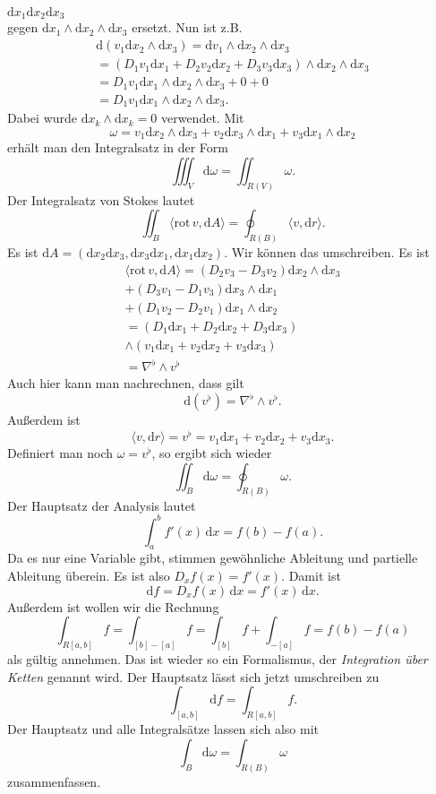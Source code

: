\documentclass[a4paper,10pt,fleqn,twocolumn,twoside]{article}
\begin{document}
$\mathrm dx_1\mathrm dx_2\mathrm dx_3$\\
gegen $\mathrm dx_1\wedge\mathrm dx_2\wedge\mathrm dx_3$
ersetzt. Nun ist z.B.
\begin{gather*}\mathrm d(v_1\mathrm dx_2\wedge\mathrm dx_3)
= \mathrm dv_1\wedge\mathrm dx_2\wedge\mathrm dx_3\\
= (D_1v_1\mathrm dx_1+D_2v_2\mathrm dx_2+D_3v_3\mathrm dx_3)
\wedge\mathrm dx_2\wedge\mathrm dx_3\\
= D_1v_1\mathrm dx_1\wedge\mathrm dx_2\wedge\mathrm dx_3+0+0\\
= D_1v_1\mathrm dx_1\wedge\mathrm dx_2\wedge\mathrm dx_3.
\end{gather*}
Dabei wurde $\mathrm dx_k\wedge\mathrm dx_k=0$ verwendet.
Mit
\[\omega = v_1\mathrm dx_2\wedge\mathrm dx_3
+v_2\mathrm dx_3\wedge\mathrm dx_1
+v_3\mathrm dx_1\wedge\mathrm dx_2\]
erhält man den Integralsatz in der Form
\[\iiint_V \mathrm d\omega = \iint_{R(V)} \omega.\]
Der Integralsatz von Stokes lautet
\[\iint_B \langle\mathrm{rot}\,v,\mathrm dA\rangle
= \oint_{R(B)} \langle v,\mathrm dr\rangle.\]
Es ist
$\mathrm dA = (\mathrm dx_2\mathrm dx_3,\mathrm dx_3\mathrm dx_1,
\mathrm dx_1\mathrm dx_2)$.
Wir können das umschreiben. Es ist
\begin{gather*}
\langle\mathrm{rot}\,v,\mathrm dA\rangle
= (D_2v_3-D_3v_2)\mathrm dx_2\wedge\mathrm dx_3\\
+ (D_3v_1-D_1v_3)\mathrm dx_3\wedge\mathrm dx_1\\
+ (D_1v_2-D_2v_1)\mathrm dx_1\wedge\mathrm dx_2\\
= (D_1\mathrm dx_1+D_2\mathrm dx_2+D_3\mathrm dx_3)\\
\wedge (v_1\mathrm dx_1+v_2\mathrm dx_2+v_3\mathrm dx_3)\\
= \nabla^\flat\wedge v^\flat
\end{gather*}
Auch hier kann man nachrechnen, dass gilt
\[\mathrm d(v^\flat) = \nabla^\flat\wedge v^\flat.\]
Außerdem ist
\[\langle v,\mathrm dr\rangle = v^\flat
= v_1\mathrm dx_1+v_2\mathrm dx_2+v_3\mathrm dx_3.\]
Definiert man noch $\omega = v^\flat$, so ergibt sich wieder
\[\iint_B \mathrm d\omega = \oint_{R(B)}\omega.\]
%
Der Hauptsatz der Analysis lautet
\[\int_a^b f'(x)\,\mathrm dx = f(b)-f(a).\]
Da es nur eine Variable gibt, stimmen gewöhnliche Ableitung und
partielle Ableitung überein. Es ist also $D_x f(x) = f'(x)$.
%
Damit ist
\[\mathrm df = D_x f(x)\,\mathrm dx = f'(x)\,\mathrm dx.\]
%
Außerdem ist wollen wir die Rechnung
\[\int_{R[a,b]} f = \int_{[b]-[a]}f = \int_{[b]} f + \int_{-[a]} f
= f(b)-f(a)\]
als gültig annehmen. Das ist wieder so ein Formalismus, der
\textit{Integration über Ketten} genannt wird.
%
Der Hauptsatz lässt sich jetzt umschreiben zu
\[\int_{[a,b]} \mathrm df = \int_{R[a,b]}f.\]
Der Hauptsatz und alle Integralsätze lassen sich also mit
\[\int_B \mathrm d\omega = \int_{R(B)}\omega\]
zusammenfassen.
\end{document}
